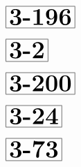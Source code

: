 \documentclass[a4paper, 10pt]{article}
\begin{document}
\begin{minipage}[t]{0.15\textwidth}
                \vspace*{-1.59cm}
        \hspace*{0.25cm}
        $\boxed{\textbf{\Huge3-196}}$
\end{minipage}
\begin{minipage}[t]{0.85\textwidth}
    
\end{minipage}

\begin{minipage}[t]{0.15\textwidth}
                \vspace*{-1.59cm}
        \hspace*{1.25cm}
        $\boxed{\textbf{\Huge3-2}}$
\end{minipage}
\begin{minipage}[t]{0.85\textwidth}
    
\end{minipage}

\thispagestyle{empty}
\begin{minipage}[t]{0.15\textwidth}
                \vspace*{-1.59cm}
        \hspace*{0.25cm}
        $\boxed{\textbf{\Huge3-200}}$
\end{minipage}
\begin{minipage}[t]{0.85\textwidth}
    
\end{minipage}

\begin{minipage}[t]{0.15\textwidth}
                \vspace*{-1.59cm}
        \hspace*{0.75cm}
        $\boxed{\textbf{\Huge3-24}}$
\end{minipage}
\begin{minipage}[t]{0.85\textwidth}
    
\end{minipage}

\begin{minipage}[t]{0.15\textwidth}
                \vspace*{-1.59cm}
        \hspace*{0.75cm}
        $\boxed{\textbf{\Huge3-73}}$
\end{minipage}
\begin{minipage}[t]{0.85\textwidth}
    
\end{minipage}
\end{document}
